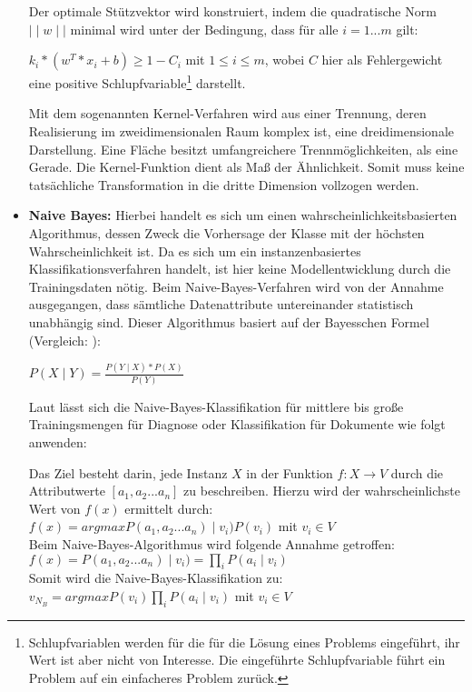 \begin{itemize}
Der optimale Stützvektor wird konstruiert, indem die quadratische Norm \(\mid \mid w \mid \mid\) minimal wird unter der Bedingung, dass für alle \(i = 1...m\) gilt: 

\(k_i*(w^T * x_i+b) \geq 1 -C_i \) mit \(1 \leq i \leq m\), wobei \(C\) hier als Fehlergewicht eine positive Schlupfvariable\footnote{Schlupfvariablen werden für die für die Lösung eines Problems eingeführt, ihr Wert ist aber nicht von Interesse. Die eingeführte Schlupfvariable führt ein Problem auf ein einfacheres Problem zurück.} darstellt.  

Mit dem sogenannten Kernel-Verfahren wird aus einer Trennung, deren Realisierung im zweidimensionalen Raum komplex ist, eine dreidimensionale Darstellung. Eine Fläche besitzt umfangreichere Trennmöglichkeiten, als eine Gerade. Die Kernel-Funktion dient als Maß der Ähnlichkeit. Somit muss keine tatsächliche Transformation in die dritte Dimension vollzogen werden.  

\item \textbf{Naive Bayes:} Hierbei handelt es sich um einen wahrscheinlichkeitsbasierten Algorithmus, dessen Zweck die Vorhersage der Klasse mit der höchsten Wahrscheinlichkeit ist. Da es sich um ein instanzenbasiertes Klassifikationsverfahren handelt, ist hier keine Modellentwicklung durch die Trainingsdaten nötig. Beim Naive-Bayes-Verfahren wird von der Annahme ausgegangen, dass sämtliche Datenattribute untereinander statistisch unabhängig sind. Dieser Algorithmus basiert auf der Bayesschen Formel (Vergleich: ):

\(P(X \mid Y) = \frac{P(Y \mid X) * P(X)}{P(Y)} \)

Laut  lässt sich die Naive-Bayes-Klassifikation für mittlere bis große Trainingsmengen für Diagnose oder Klassifikation für Dokumente wie folgt anwenden:

Das Ziel besteht darin, jede Instanz \(X\) in der Funktion \(f: X \to V\) durch die Attributwerte \([a_1, a_2...a_n]\) zu beschreiben. 
Hierzu wird der wahrscheinlichste Wert von \(f(x)\) ermittelt durch: \\  
\(f(x) = argmax P(a_1, a_2...a_n) \mid v_i)P(v_i) \) mit  \(v_i \in V \) \\
Beim Naive-Bayes-Algorithmus wird folgende Annahme getroffen: \\ 
 \(f(x) = P(a_1, a_2...a_n) \mid v_i) = \prod_i P(a_i \mid v_i) \) \\
Somit wird die Naive-Bayes-Klassifikation zu:  \\
\(v_N_B = argmax P(v_i) \prod_i P(a_i \mid v_i) \) mit \( v_i \in V \)  \\


\end{itemize}
